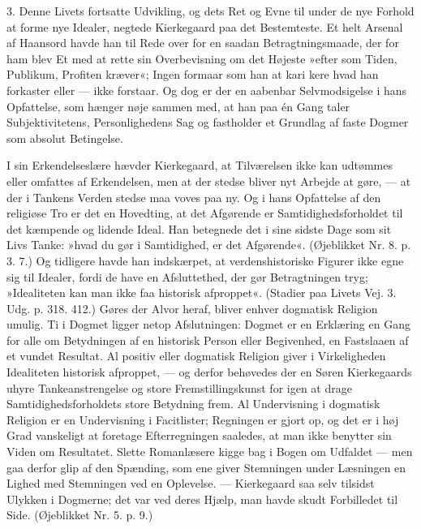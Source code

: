 \documentclass[12pt,a4paper,openany]{book}
\newcommand{\opage}[1]{\marginnote{\footnotesize\textit{[#1]}}}
\begin{document}
3. Denne Livets fortsatte Udvikling, og dets Ret
og Evne til under de nye Forhold at forme nye Idealer,
negtede Kierkegaard paa det Bestemteste. Et helt Arsenal
af Haansord havde han til Rede over for en saadan
Betragtningsmaade, der for ham blev Et med at rette sin
Overbevisning om det Højeste »efter som Tiden, Publikum,
Profiten kræver«; Ingen formaar som han at kari%
\opage{157}kere hvad han forkaster eller --- ikke forstaar. Og dog
er der en aabenbar Selvmodsigelse i hans Opfattelse, som
hænger nøje sammen med, at han paa én Gang taler
Subjektivitetens, Personlighedens Sag og fastholder et
Grundlag af faste Dogmer som absolut Betingelse.

I sin Erkendelseslære hævder Kierkegaard, at Tilværelsen
ikke kan udtømmes eller omfattes af Erkendelsen,
men at der stedse bliver nyt Arbejde at gøre, --- at
der i Tankens Verden stedse maa voves paa ny. Og i
hans Opfattelse af den religiøse Tro er det en Hovedting,
at det Afgørende er Samtidighedsforholdet til det kæmpende
og lidende Ideal. Han betegnede det i sine sidste
Dage som sit Livs Tanke: »hvad du gør i Samtidighed,
er det Afgørende«. (Øjeblikket Nr. 8. p. 3. 7.) Og tidligere
havde han indskærpet, at verdenshistoriske Figurer
ikke egne sig til Idealer, fordi de have en Afsluttethed,
der gør Betragtningen tryg; »Idealiteten kan man ikke
faa historisk afproppet«. (Stadier paa Livets Vej. 3. Udg.
p. 318. 412.) Gøres der Alvor heraf, bliver enhver dogmatisk
Religion umulig. Ti i Dogmet ligger netop Afslutningen:
Dogmet er en Erklæring en Gang for alle
om Betydningen af en historisk Person eller Begivenhed,
en Fastslaaen af et vundet Resultat. Al positiv eller
dogmatisk Religion giver i Virkeligheden Idealiteten
historisk afproppet, --- og derfor behøvedes der en Søren
Kierkegaards uhyre Tankeanstrengelse og store Fremstillingskunst
for igen at drage Samtidighedsforholdets store
Betydning frem. Al Undervisning i dogmatisk Religion
er en Undervisning i Facitlister; Regningen er gjort op,
og det er i høj Grad vanskeligt at foretage Efterregningen
saaledes, at man ikke benytter sin Viden om Resultatet.
Slette Romanlæsere kigge bag i Bogen om Udfaldet ---
men gaa derfor glip af den Spænding, som ene giver
Stemningen under Læsningen en Lighed med Stemningen
\opage{158}ved en Oplevelse. --- Kierkegaard saa selv tilsidst Ulykken
i Dogmerne; det var ved deres Hjælp, man havde skudt
Forbilledet til Side. (Øjeblikket Nr. 5. p. 9.)
\end{document}
